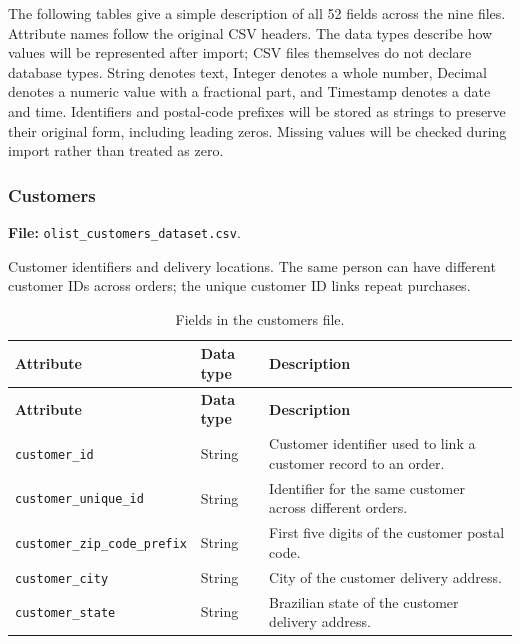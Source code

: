 \documentclass[a4paper,12pt]{article}
\newcommand{\tablestyle}{%
  \small\setstretch{1.05}%
  \renewcommand{\arraystretch}{1.25}%
  \setlength{\extrarowheight}{3pt}%
  \arrayrulecolor{tableborder}%
}
\begin{document}
The following tables give a simple description of all 52 fields across the nine
files. Attribute names follow the original CSV headers. The data types describe
how values will be represented after import; CSV files themselves do not declare
database types. String denotes text, Integer denotes a whole number, Decimal
denotes a numeric value with a fractional part, and Timestamp denotes a date and
time. Identifiers and postal-code prefixes will be stored as strings to preserve
their original form, including leading zeros. Missing values will be checked
during import rather than treated as zero.

\subsubsection{Customers}

\textbf{File:} \nolinkurl{olist_customers_dataset.csv}.

Customer identifiers and delivery locations. The same person can have different customer IDs across orders; the unique customer ID links repeat purchases.

{\tablestyle
\begin{longtable}{|L{5.7cm}|L{2.1cm}|L{\dimexpr\textwidth-7.8cm-6\arrayrulewidth\relax}|}
  \caption{Fields in the customers file.}
  \label{tab:dataset-1}\\
  \hline
  \textbf{Attribute} & \textbf{Data type} & \textbf{Description} \\[3pt]\hline
  \endfirsthead
  \hline
  \textbf{Attribute} & \textbf{Data type} & \textbf{Description} \\[3pt]\hline
  \endhead
  \endfoot
  \endlastfoot
  \nolinkurl{customer_id} & String & Customer identifier used to link a customer record to an order. \\[3pt]\hline
  \nolinkurl{customer_unique_id} & String & Identifier for the same customer across different orders. \\[3pt]\hline
  \nolinkurl{customer_zip_code_prefix} & String & First five digits of the customer postal code. \\[3pt]\hline
  \nolinkurl{customer_city} & String & City of the customer delivery address. \\[3pt]\hline
  \nolinkurl{customer_state} & String & Brazilian state of the customer delivery address. \\[3pt]\hline
\end{longtable}
}
\end{document}
